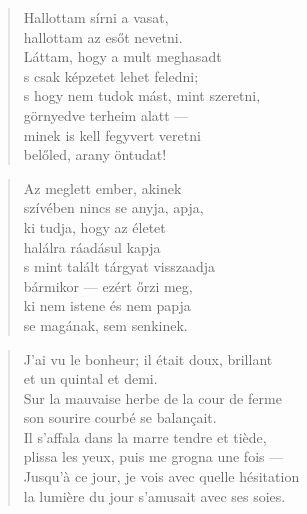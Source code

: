 \newpage

\vspace*{-15mm}
\centeredornament



\begin{verse}
  Hallottam sírni a vasat, \\
  hallottam az esőt nevetni. \\
  Láttam, hogy a mult meghasadt \\
  s csak képzetet lehet feledni; \\
  s hogy nem tudok mást, mint szeretni, \\
  görnyedve terheim alatt --- \\
  minek is kell fegyvert veretni \\
  belőled, arany öntudat!
\end{verse}

\bigskip


\begin{verse}
  Az meglett ember, akinek \\
  szívében nincs se anyja, apja, \\
  ki tudja, hogy az életet \\
  halálra ráadásul kapja \\
  s mint talált tárgyat visszaadja \\
  bármikor --- ezért őrzi meg, \\
  ki nem istene és nem papja \\
  se magának, sem senkinek.
\end{verse}

\newpage

\vspace*{-15mm}
\centeredornament




\begin{verse}
  J'ai vu le bonheur; il était doux, brillant \\
  et un quintal et demi. \\
  Sur la mauvaise herbe de la cour de ferme \\
  son sourire courbé se balançait. \\
  Il s'affala dans la marre tendre et tiède, \\
  plissa les yeux, puis me grogna une fois --- \\
  Jusqu'à ce jour, je vois avec quelle hésitation \\
  la lumière du jour s'amusait avec ses soies.
\end{verse}

